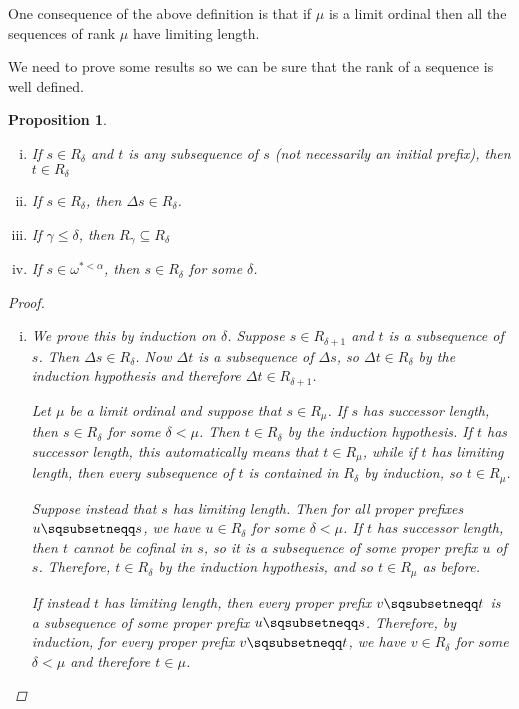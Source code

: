 \documentclass[11pt]{article} %
\theoremstyle{plain} %
\newtheorem{proposition}[theorem]{Proposition}
\theoremstyle{definition} %
\theoremstyle{note}
\theoremstyle{exercisestyle}
\newcommand{\pprefix}{\sqsubsetneqq}
\renewcommand{\subset}{\subseteq}
\begin{document}
One consequence of the above definition is that if $\mu$ is a limit ordinal then all the sequences of rank $\mu$ have limiting length.

We need to prove some results so we can be sure that the rank of a sequence is well defined.  

\begin{proposition}
  \label{RankProposition}
  \begin{enumerate}[i)]
    \item If $s\in R_\delta$ and $t$ is any subsequence of $s$ (not necessarily an initial prefix), then $t\in R_\delta$
    \item If $s\in R_\delta$, then $\Delta s\in R_\delta$.
    \item If $\gamma\le\delta$, then $R_\gamma\subset R_\delta$
    \item If $s\in\omega^{*<\alpha}$, then $s\in R_\delta$ for some $\delta$.
  \end{enumerate}

  \begin{proof}
    \begin{enumerate}[(i): ]
      \item We prove this by induction on $\delta$.  Suppose $s\in R_{\delta+1}$ and $t$ is a subsequence of $s$.  Then $\Delta s\in R_\delta$.  Now $\Delta t$ is a subsequence of $\Delta s$, so $\Delta t\in R_\delta$ by the induction hypothesis and therefore $\Delta t\in R_{\delta +1}$.  

        Let $\mu$ be a limit ordinal and suppose that $s\in R_\mu$.  If $s$ has successor length, then $s\in R_\delta$ for some $\delta<\mu$.  Then $t\in R_\delta$ by the induction hypothesis.  If $t$ has successor length, this automatically means that $t\in R_\mu$, while if $t$ has limiting length, then every subsequence of $t$ is contained in $R_\delta$ by induction, so $t\in R_\mu$.  

        Suppose instead that $s$ has limiting length.  Then for all proper prefixes $u\pprefix s$, we have $u\in R_\delta$ for some $\delta<\mu$.  If $t$ has successor length, then $t$ cannot be cofinal in $s$, so it is a subsequence of some proper prefix $u$ of $s$.  Therefore, $t\in R_\delta$ by the induction hypothesis, and so $t\in R_\mu$ as before.  

        If instead $t$ has limiting length, then every proper prefix $v\pprefix t$ is a subsequence of some proper prefix $u\pprefix s$.  Therefore, by induction, for every proper prefix $v\pprefix t$, we have $v\in R_\delta$ for some $\delta<\mu$ and therefore $t\in\mu$.  


\end{enumerate}
\end{proof}
\end{proposition}
\end{document}
